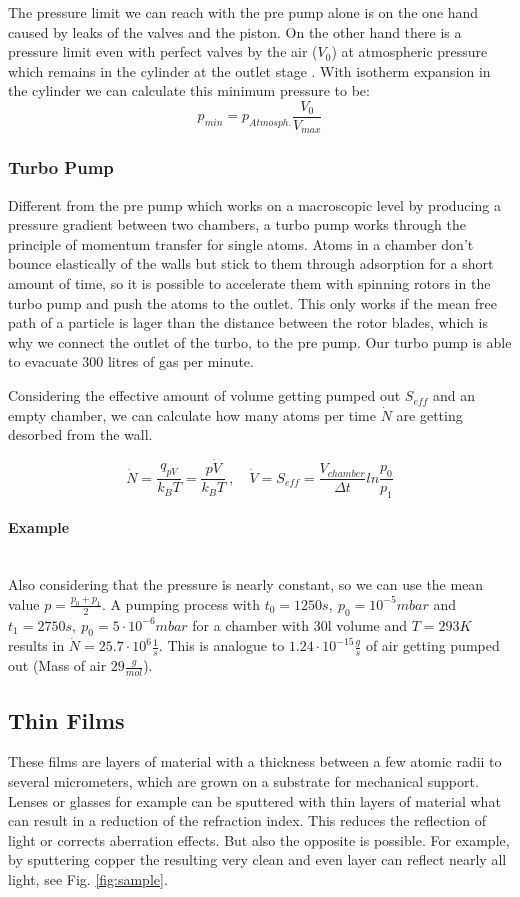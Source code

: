 \documentclass[]{article}
\begin{document}
The pressure limit we can reach with the pre pump alone is on the one hand caused by leaks of the valves and the piston. On the other hand there is a pressure limit even with perfect valves by the air ($V_{0} $) at atmospheric pressure which remains in the cylinder at the outlet stage . With isotherm expansion in the cylinder we can calculate this minimum pressure to be: \[ p_{min}=p_{Atmosph.}\frac{V_{0}}{V_{max}} \]

\subsubsection{Turbo Pump}
Different from the pre pump which works on a macroscopic level by producing a pressure gradient between two chambers, a turbo pump works through the principle of momentum transfer for single atoms. Atoms in a chamber don't bounce elastically of the walls but stick to them through adsorption for a short amount of time, so it is possible to accelerate them with spinning rotors in the turbo pump and push the atoms to the outlet. This only works if the mean free path of a particle is lager than the distance between the rotor blades, which is why we connect the outlet of the turbo, to the pre pump. Our turbo pump is able to evacuate 300 litres of gas per minute.

Considering the effective amount of volume getting pumped out $S_{eff}$ and an empty chamber, we can calculate how many atoms per time $\dot{N}$ are getting desorbed from the wall.

\[ \dot{N}=\frac{q_{pV}}{k_BT}= \frac{p\dot{V}}{k_BT} \: , \quad \dot{V}=S_{eff}= \frac{V_{chamber}}{\Delta t}ln \frac{p_0}{p_1} \]

\paragraph{Example}\mbox{}\\
Also considering that the pressure is nearly constant, so we can use the mean value $p=\frac{p_0+p_1}{2}$. A pumping process with $t_0=1250s,\: p_0=10^{-5}mbar$ and $t_1=2750s,\: p_0=5\cdot 10^{-6}mbar$ for a chamber with 30l volume and $T=293K$ results in $\dot{N}=25.7\cdot 10^{6} \frac{1}{s}$. This is analogue to $1.24\cdot 10^{-15} \frac{g}{s}$ of air getting pumped out (Mass of air $29 \frac{g}{mol}$).
\label{dn}



\subsection{Thin Films}
These films are layers of material with a thickness between a few atomic radii to several micrometers, which are grown on a substrate for mechanical support. Lenses or glasses for example can be sputtered with thin layers of material what can result in a reduction of the refraction index. This reduces the reflection of light or corrects aberration effects. But also the opposite is possible. For example, by sputtering copper the resulting very clean and even layer can reflect nearly all light, see Fig. \ref{fig:sample}. 
\end{document}
